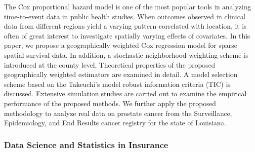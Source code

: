 \begin{itemize}
The Cox proportional hazard model is one of the most popular tools in analyzing time-to-event data in public health studies. When outcomes observed in clinical data from different regions yield a varying pattern correlated with location, it is often of great interest to investigate spatially varying effects of covariates. In this paper, we propose a geographically weighted Cox regression model for sparse spatial survival data. In addition, a stochastic neighborhood weighting scheme is introduced at the county level. Theoretical properties of the proposed geographically weighted estimators are examined in detail. A model selection scheme based on the Takeuchi’s model robust information criteria (TIC) is discussed. Extensive simulation studies are carried out to examine the empirical performance of the proposed methods. We further apply the proposed methodology to analyze real data on prostate cancer from the Surveillance, Epidemiology, and End Results cancer registry for the state of Louisiana.

\end{itemize}

\subsubsection*{Data Science and Statistics in Insurance}

